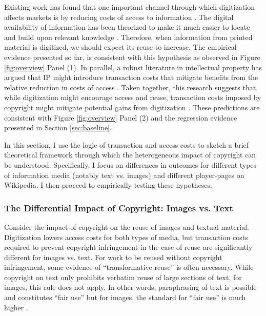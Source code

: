 \documentclass[11pt]{article}
\begin{document}
Existing work has found that one important channel through which digitization affects markets is by reducing costs of access to information \citep{goldfarb_introduction_2014, bakos_reducing_1997}. The digital availability of information has been theorized to make it much easier to locate and build upon relevant knowledge \citep{shapiro_information_1999, chiou_copyright_2011}. Therefore, when information from printed material is digitized, we should expect its reuse to increase. The empirical evidence presented so far, is consistent with this hypothesis as observed in Figure \ref{fig:overview} Panel (1). In parallel, a robust literature in intellectual property has argued that IP might introduce transaction costs that mitigate benefits from the relative reduction in costs of access \citep{waldfogel_copyright_2012, williams_intellectual_2013, murray_formal_2007}. Taken together, this research suggests that, while digitization might encourage access and reuse, transaction costs imposed by copyright might mitigate potential gains from digitization \citep{gans_remix_2015}. These predictions are consistent with Figure \ref{fig:overview} Panel (2) and the regression evidence presented in Section \ref{sec:baseline}.

In this section, I use the logic of transaction and access costs to sketch a brief theoretical framework through which the heterogeneous impact of copyright can be understood. Specifically, I focus on differences in outcomes for different types of information media (notably text vs. images) and different player-pages on Wikipedia. I then proceed to empirically testing these hypotheses. 

\subsubsection{The Differential Impact of Copyright: Images vs. Text}

Consider the impact of copyright on the reuse of images and textual material. Digitization lowers access costs for both types of media, but transaction costs required to prevent copyright infringement in the case of reuse are significantly different for images vs. text. For work to be reused without copyright infringement, some evidence of ``transformative reuse'' is often necessary. While copyright on text only prohibits verbatim reuse of large sections of text, for images, this rule does not apply. In other words, paraphrasing of text is possible and constitutes ``fair use'' but for images, the standard for ``fair use'' is much higher \citep{leval_toward_1990}. 
\end{document}
